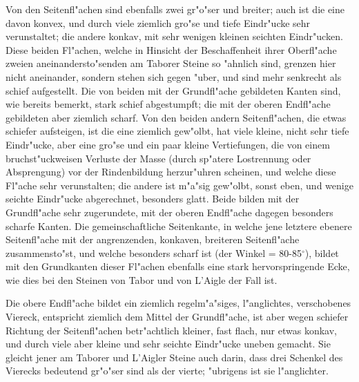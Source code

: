\documentclass[a4paper, 11pt, oneside, german]{article}
\begin{document}
Von den Seitenfl"achen sind ebenfalls zwei gr"o"ser und breiter; auch ist die eine davon konvex, und durch viele ziemlich gro"se und tiefe Eindr"ucke sehr verunstaltet; die andere konkav, mit sehr wenigen kleinen seichten Eindr"ucken. Diese beiden Fl"achen, welche in Hinsicht der Beschaffenheit ihrer Oberfl"ache zweien aneinandersto"senden am Taborer Steine so "ahnlich sind, grenzen hier nicht aneinander, sondern stehen sich gegen "uber, und sind mehr senkrecht als schief aufgestellt. Die von beiden mit der Grundfl"ache gebildeten Kanten sind, wie bereits bemerkt, stark schief abgestumpft; die mit der oberen Endfl"ache gebildeten aber ziemlich scharf. Von den beiden andern Seitenfl"achen, die etwas schiefer aufsteigen, ist die eine ziemlich gew"olbt, hat viele kleine, nicht sehr tiefe Eindr"ucke, aber eine gro"se und ein paar kleine Vertiefungen, die von einem bruchst"uckweisen Verluste der Masse (durch sp"atere Lostrennung oder Absprengung) vor der Rindenbildung herzur"uhren scheinen, und welche diese Fl"ache sehr verunstalten; die andere ist m"a"sig gew"olbt, sonst eben, und wenige seichte Eindr"ucke abgerechnet, besonders glatt. Beide bilden mit der Grundfl"ache sehr zugerundete, mit der oberen Endfl"ache dagegen besonders scharfe Kanten. Die gemeinschaftliche Seitenkante, in welche jene letztere ebenere Seitenfl"ache mit der angrenzenden, konkaven, breiteren Seitenfl"ache zusammensto"st, und welche besonders scharf ist (der Winkel = 80-85$^{\circ}$), bildet mit den Grundkanten dieser Fl"achen ebenfalls eine stark hervorspringende Ecke, wie dies bei den Steinen von Tabor und von L'Aigle der Fall ist.

Die obere Endfl"ache bildet ein ziemlich regelm"a"siges, l"anglichtes, verschobenes Viereck, entspricht ziemlich dem Mittel der Grundfl"ache, ist aber wegen schiefer Richtung der Seitenfl"achen betr"achtlich kleiner, fast flach, nur etwas konkav, und durch viele aber kleine und sehr seichte Eindr"ucke uneben gemacht. Sie gleicht jener am Taborer und L'Aigler Steine auch darin, dass drei Schenkel des Vierecks bedeutend gr"o"ser sind als der vierte; "ubrigens ist sie l"anglichter.
\end{document}
